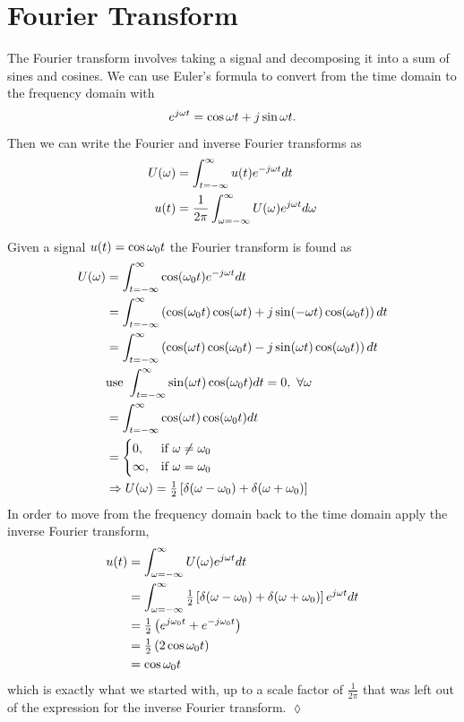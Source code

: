 \section{Fourier Transform}
The Fourier transform involves taking a signal and decomposing it into a sum of sines and cosines. We can use Euler's formula to convert from the time domain to the frequency domain with
$$e^{j\omega t} = \cos\omega t + j\sin\omega t.$$
Then we can write the Fourier and inverse Fourier transforms as
\begin{align*}
U(\omega) &= \int_{t=-\infty}^\infty u(t)e^{-j\omega t}dt \\
u(t) &= \frac{1}{2\pi} \int_{\omega=-\infty}^\infty U(\omega)e^{j\omega t}d\omega
\end{align*}

\begin{example}
Given a signal $u(t)=\cos\omega_0 t$ the Fourier transform is found as
\begin{align*}
U(\omega) &= \int_{t=-\infty}^\infty \cos(\omega_0 t)e^{-j\omega t}dt \\
&= \int_{t=-\infty}^\infty \left(\cos(\omega_0 t)\cos(\omega t) + j\sin(-\omega t)\cos(\omega_0 t)\right)dt \\
&= \int_{t=-\infty}^\infty \left(\cos(\omega t)\cos(\omega_0 t) - j\sin(\omega t)\cos(\omega_0 t)\right)dt \\
&\text{use }\int_{t=-\infty}^\infty \sin(\omega t)\cos(\omega_0 t)dt = 0, ~ \forall \omega \\
&= \int_{t=-\infty}^\infty \cos(\omega t)\cos(\omega_0 t)dt \\
&= \begin{cases} 0, & \text{if } \omega \neq \omega_0 \\ \infty, & \text{if } \omega = \omega_0 \end{cases} \\
&\Rightarrow U(\omega) = \tfrac{1}{2} \left[\delta(\omega-\omega_0) + \delta(\omega+\omega_0)\right]
\end{align*}
In order to move from the frequency domain back to the time domain apply the inverse Fourier transform,
\begin{align*}
u(t) &= \int_{\omega=-\infty}^\infty U(\omega)e^{j\omega t}dt \\
&= \int_{\omega=-\infty}^\infty \tfrac{1}{2} \left[\delta(\omega-\omega_0) + \delta(\omega+\omega_0)\right] e^{j\omega t}dt \\
&= \tfrac{1}{2}\left(e^{j\omega_0 t} + e^{-j\omega_0 t}\right) \\
&= \tfrac{1}{2}\left(2\cos\omega_0 t\right) \\
&= \cos\omega_0 t
\end{align*}
which is exactly what we started with, up to a scale factor of $\frac{1}{2\pi}$ that was left out of the expression for the inverse Fourier transform.
$\lozenge$
\end{example}

